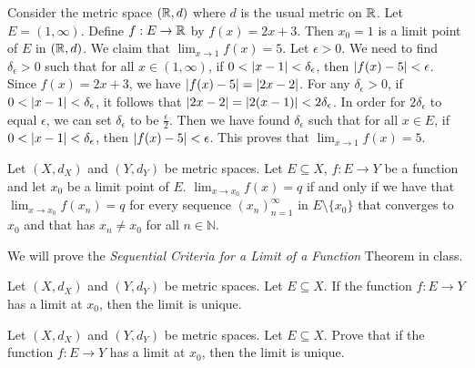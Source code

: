 \documentclass[../main.tex]{subfiles}
\begin{document}
\begin{example}
    Consider the metric space $(\mathbb R, d)$ where $d$ is the usual metric on $\mathbb R$. Let $E = (1, \infty)$. Define $f: E \to \mathbb R$ by $f(x) = 2x + 3$. Then $x_0 = 1$ is a limit point of $E$ in $(\mathbb R, d)$. We claim that $\lim_{x \to 1} f(x) = 5$. Let $\epsilon > 0$. We need to find $\delta_{\epsilon} > 0$ such that for all $x \in (1, \infty)$, if $0 < \left| x - 1 \right| < \delta_{\epsilon}$, then $\left| f(x) - 5 \right| < \epsilon$. Since $f(x) = 2x + 3$, we have $\left| f(x) - 5 \right| = \left| 2x - 2 \right|$. For any $\delta_{\epsilon} > 0$, if $0 < \left| x - 1 \right| < \delta_{\epsilon}$, it follows that $\left| 2x - 2 \right| = \left| 2(x - 1) \right| < 2 \delta_{\epsilon}$. In order for $2\delta_{\epsilon}$ to equal $\epsilon$, we can set $\delta_{\epsilon}$ to be $\frac{\epsilon}{2}$. Then we have found $\delta_{\epsilon}$ such that for all $x \in E$, if $0 < \left| x - 1 \right| < \delta_{\epsilon}$, then $\left| f(x) - 5 \right| < \epsilon$. This proves that $\lim_{x \to 1} f(x) = 5$.
\end{example}

\begin{theorem}
Let $(X,d_X)$ and $(Y,d_Y)$ be metric spaces. Let $E \subseteq X$, $f:E \rightarrow Y$ be a function and let $x_0$ be a limit point of $E$.  $\lim_{x \to x_0}f(x) = q$ if and only if we have that $\lim_{x \to x_0} f(x_n) = q$ for every sequence $(x_n)^{\infty}_{n=1}$ in $ E \setminus \{x_0\}$ that converges to $x_0$ and that has $x_n \neq x_0$ for all $n \in \mathbb{N}$. 

\end{theorem}

\noindent We will prove the \emph{Sequential Criteria for a Limit of a Function} Theorem in class.

\begin{theorem}
    Let $(X,d_X)$ and $(Y,d_Y)$ be metric spaces. Let $E \subseteq X$. If the function $f:E \rightarrow Y$ has a limit at $x_0$, then the limit is unique.
\end{theorem}

\begin{exercise}
    Let $(X,d_X)$ and $(Y,d_Y)$ be metric spaces. Let $E \subseteq X$. Prove that if the function $f:E \rightarrow Y$ has a limit at $x_0$, then the limit is unique.
\end{exercise}
\end{document}
